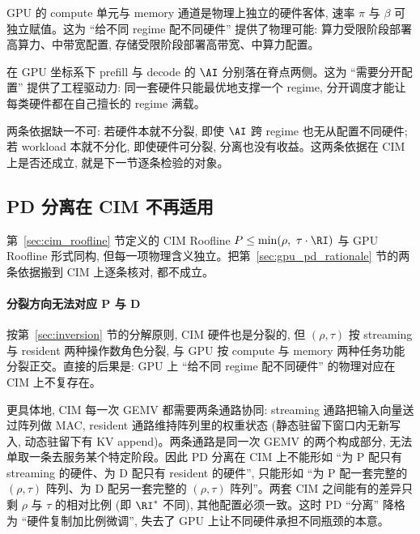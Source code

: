 \begin{description}[leftmargin=*, itemsep=4pt]
    \item[\textbf{资源分裂架构 (硬件侧)}:] GPU 的 compute 单元与 memory 通道是物理上独立的硬件客体, 速率 $\pi$ 与 $\beta$ 可独立赋值。这为 “给不同 regime 配不同硬件” 提供了物理可能: 算力受限阶段部署高算力、中带宽配置, 存储受限阶段部署高带宽、中算力配置。
    \item[\textbf{跨 regime 分化 (workload 侧)}:] 在 GPU 坐标系下 prefill 与 decode 的 $\AI$ 分别落在脊点两侧。这为 “需要分开配置” 提供了工程驱动力: 同一套硬件只能最优地支撑一个 regime, 分开调度才能让每类硬件都在自己擅长的 regime 满载。
\end{description}

两条依据缺一不可: 若硬件本就不分裂, 即使 $\AI$ 跨 regime 也无从配置不同硬件; 若 workload 本就不分化, 即使硬件可分裂, 分离也没有收益。这两条依据在 CIM 上是否还成立, 就是下一节逐条检验的对象。

\subsection{PD 分离在 CIM 不再适用}
\label{sec:pd_failure}

第~\ref{sec:cim_roofline} 节定义的 CIM Roofline $P \le \min(\rho,\ \tau\cdot\RI)$ 与 GPU Roofline 形式同构, 但每一项物理含义独立。把第~\ref{sec:gpu_pd_rationale} 节的两条依据搬到 CIM 上逐条核对, 都不成立。

\paragraph{分裂方向无法对应 P 与 D}
按第~\ref{sec:inversion} 节的分解原则, CIM 硬件也是分裂的, 但 $(\rho, \tau)$ 按 streaming 与 resident 两种操作数角色分裂, 与 GPU 按 compute 与 memory 两种任务功能分裂正交。直接的后果是: GPU 上 “给不同 regime 配不同硬件” 的物理对应在 CIM 上不复存在。

更具体地, CIM 每一次 GEMV 都需要两条通路协同: streaming 通路把输入向量送过阵列做 MAC, resident 通路维持阵列里的权重状态 (静态驻留下窗口内无新写入, 动态驻留下有 KV append)。两条通路是同一次 GEMV 的两个构成部分, 无法单取一条去服务某个特定阶段。因此 PD 分离在 CIM 上不能形如 “为 P 配只有 streaming 的硬件、为 D 配只有 resident 的硬件”, 只能形如 “为 P 配一套完整的 $(\rho, \tau)$ 阵列、为 D 配另一套完整的 $(\rho, \tau)$ 阵列”。两套 CIM 之间能有的差异只剩 $\rho$ 与 $\tau$ 的相对比例 (即 $\RI^{*}$ 不同), 其他配置必须一致。这时 PD “分离” 降格为 “硬件复制加比例微调”, 失去了 GPU 上让不同硬件承担不同瓶颈的本意。

